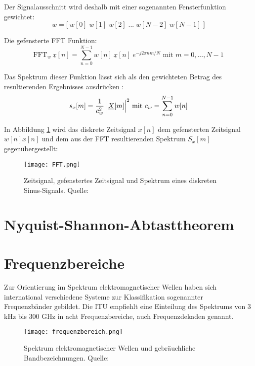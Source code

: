 Der Signalausschnitt wird deshalb mit einer sogenannten Fensterfunktion gewichtet: 
\[w = \Big[ \:  w[0] \; w[1] \; w[2] \; ... \; w[N - 2] \; w[N - 1] \; \Big] \]


Die gefensterte FFT Funktion:
\[\text{FFT} _w \: {\underline{x}[n]} = \sum_{n=0}^{N-1} w[n] \: \underline{x}[n] \: e^{-j2\pi nm / N} \text{ mit } m = 0, ..., N-1\]


Das Spektrum dieser Funktion lässt sich als den gewichteten Betrag des resultierenden Ergebnisses ausdrücken \cite[vgl. Heuberger, e. a., S. 14]{Heuberger:2017}:
\[s_x[m] = \frac{1}{c_w^2} \: \Big{|}\underline{X}[m]  \Big{|}^2 \text{ mit } c_w = \sum_{n=0}^{N-1} w[n] \]

In Abbildung \ref{fft} wird das diskrete Zeitsignal \(x[n]\) dem gefensterten Zeitsignal \(w[n]x[n]\) und dem aus der FFT resultierenden Spektrum \(S_x[m]\) gegenübergestellt:
\begin{figure}[ht]
	\centering
	\texttt{[image: FFT.png]}
	\caption[Zeitsignal, gefenstertes Zeitsignal und Spektrum eines diskreten Sinus-Signals]{Zeitsignal, gefenstertes Zeitsignal und Spektrum eines diskreten Sinus-Signals. Quelle: \cite[Heuberger, e. a., S. 16]{Heuberger:2017}} 
	\label{fft}
\end{figure}

\section{Nyquist-Shannon-Abtasttheorem}

\newpage
\section{Frequenzbereiche}
Zur Orientierung im Spektrum elektromagnetischer Wellen haben sich international verschiedene Systeme zur Klassifikation sogenannter Frequenzbänder gebildet. Die \ac{ITU} empfiehlt eine Einteilung des Spektrums von 3 kHz bis 300 GHz in acht Frequenzbereiche, auch Frequenzdekaden genannt. \cite[vgl. ITU-R v.431-8]{itu-431:2015}

\begin{figure}[ht]
	\centering
	\texttt{[image: frequenzbereich.png]}
	\caption[Spektrum elektromagnetischer Wellen und gebräuchliche Bandbezeichnungen]{Spektrum elektromagnetischer Wellen und gebräuchliche Bandbezeichnungen. Quelle: \cite[Kark, S. 1]{Kark:2017}} 
	\label{frequenzbereiche}
\end{figure}


